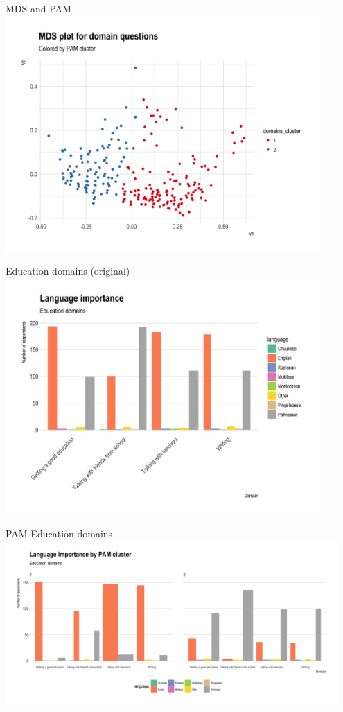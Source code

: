 \documentclass[10pt]{beamer}
\begin{document}
\begin{frame}{MDS and PAM}
\includegraphics[width=0.9\textwidth]{figures/mdsdomainspam.png}
\end{frame}

\begin{frame}{Education domains (original)}
\includegraphics[width=0.9\textwidth]{figures/educationdomains.png}
\end{frame}

\begin{frame}{PAM Education domains}
\includegraphics[width=0.95\textwidth]{figures/PAMeducationdomains.png}
\end{frame}
\end{document}

